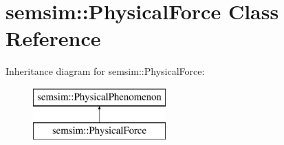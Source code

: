 \hypertarget{classsemsim_1_1PhysicalForce}{}\section{semsim\+:\+:Physical\+Force Class Reference}
\label{classsemsim_1_1PhysicalForce}
Inheritance diagram for semsim\+:\+:Physical\+Force\+:\begin{figure}[H]
\begin{center}
\leavevmode
\includegraphics[height=2.000000cm]{classsemsim_1_1PhysicalForce}
\end{center}
\end{figure}
